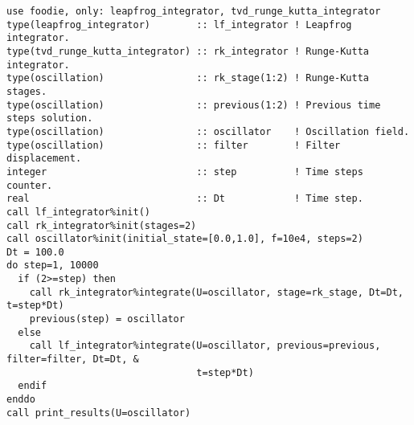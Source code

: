 \begin{lstlisting}[firstnumber=1,style=code,caption={numerical integration of the \emph{oscillation} system by means of Leapfrog RAW-filtered method},label={list:oscillation_leapfrog}]
use foodie, only: leapfrog_integrator, tvd_runge_kutta_integrator
type(leapfrog_integrator)        :: lf_integrator ! Leapfrog integrator.
type(tvd_runge_kutta_integrator) :: rk_integrator ! Runge-Kutta integrator.
type(oscillation)                :: rk_stage(1:2) ! Runge-Kutta stages.
type(oscillation)                :: previous(1:2) ! Previous time steps solution.
type(oscillation)                :: oscillator    ! Oscillation field.
type(oscillation)                :: filter        ! Filter displacement.
integer                          :: step          ! Time steps counter.
real                             :: Dt            ! Time step.
call lf_integrator%init()
call rk_integrator%init(stages=2)
call oscillator%init(initial_state=[0.0,1.0], f=10e4, steps=2)
Dt = 100.0
do step=1, 10000
  if (2>=step) then
    call rk_integrator%integrate(U=oscillator, stage=rk_stage, Dt=Dt, t=step*Dt)
    previous(step) = oscillator
  else
    call lf_integrator%integrate(U=oscillator, previous=previous, filter=filter, Dt=Dt, &
                                 t=step*Dt)
  endif
enddo
call print_results(U=oscillator)
\end{lstlisting}
  

